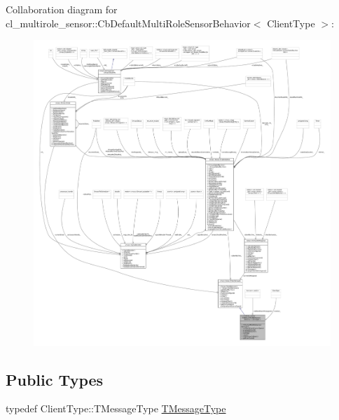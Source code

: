 Collaboration diagram for cl\+\_\+multirole\+\_\+sensor\+:\+:Cb\+Default\+Multi\+Role\+Sensor\+Behavior$<$ Client\+Type $>$\+:
\nopagebreak
\begin{figure}[H]
\begin{center}
\leavevmode
\includegraphics[width=350pt]{classcl__multirole__sensor_1_1CbDefaultMultiRoleSensorBehavior__coll__graph}
\end{center}
\end{figure}
\subsection*{Public Types}
\begin{DoxyCompactItemize}
\item 
typedef Client\+Type\+::\+T\+Message\+Type \hyperlink{classcl__multirole__sensor_1_1CbDefaultMultiRoleSensorBehavior_aa23bc8c99de1eddad01d094bdab62aa4}{T\+Message\+Type}
\end{DoxyCompactItemize}
